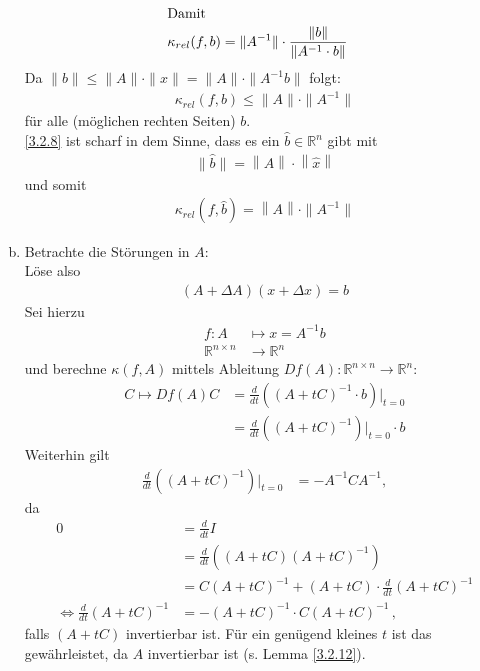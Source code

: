 \documentclass[ngerman,fontsize=11pt, paper=a4, parskip=half, titlepage=true, toc=bib]{scrbook}
\newcommand{\R}{\mathds{R}}
\newcommand{\nn}[1]{\left\| #1 \right\|}
\begin{document}
\begin{enumerate}[a)]
\begin{align}
				\intertext{Damit}
				\kappa_{rel} (f,b) &= \|A^{-1} \| \cdot \frac{\|b\|}{\|A^{-1}\cdot b\|} \label{III.2.7}
			\end{align}
			Da $\|b\| \leq \|A\|\cdot\|x\| = \|A\|\cdot \|A^{-1}b\|$ folgt:
			\begin{gather}
				\kappa_{rel}(f,b) \leq \|A\| \cdot \|A^{-1}\| \label{III.2.8}
			\end{gather}
			für alle (möglichen rechten Seiten) $b $.\\
			\ref{3.2.8} ist scharf in dem Sinne, dass es ein $\widehat{b}\in \R^n$ gibt 
			mit 
			\begin{gather*}
				\|\widehat{b}\| = \nn{A}\cdot \nn{\widehat{x}}
			\end{gather*}
			und somit
			\begin{gather*}
				\kappa_{rel}(f,\widehat{b}) = \nn{A}\cdot \| A^{-1}\|
			\end{gather*} %
	\item Betrachte die Störungen in $A$:\\
			Löse also 
			\begin{gather*}
				(A+\Delta A)(x+\Delta x) = b
			\end{gather*}
			Sei hierzu
			\begin{align*}
				f:A&\mapsto x= A^{-1}b \\
				\R^{n\times n}&\rightarrow \R^n
			\end{align*}
			und berechne $\kappa(f,A)$ mittels Ableitung $Df(A):\R^{n\times n} \rightarrow \R^n$:
			\begin{align*}
				C\mapsto Df(A) C&= \frac{d}{dt} \left((A+tC)^{-1} \cdot b\right) \Big\vert_{t=0} \\
										  & = \frac{d}{dt}\left((A+tC)^{-1}\right)\Big\vert_{t=0}\cdot b
			\end{align*}			
			Weiterhin gilt
			\begin{align}
				\frac{d}{dt} \left((A+tC)^{-1}\right) \Big\vert_{t=0} &= -A^{-1}CA^{-1}, \label{III.2.9}
			\end{align}
			da
			\begin{align*}
				0&= \frac{d}{dt}I \\
				  &= \frac{d}{dt}\left( (A+tC)(A+tC)^{-1}\right)\\
				  &= C(A+tC)^{-1} +(A+tC)\cdot \frac{d}{dt}(A+tC)^{-1} \\
				  \Leftrightarrow \frac{d}{dt} (A+ tC)^{-1} 
				  &= -(A+tC)^{-1} \cdot C(A+tC)^{-1} \, ,
			\end{align*}
			falls $(A+tC)$ invertierbar ist. Für ein genügend kleines $t$ ist das gewährleistet, da $A$ invertierbar ist (s. Lemma \ref{3.2.12}).

\end{enumerate}
\end{document}
